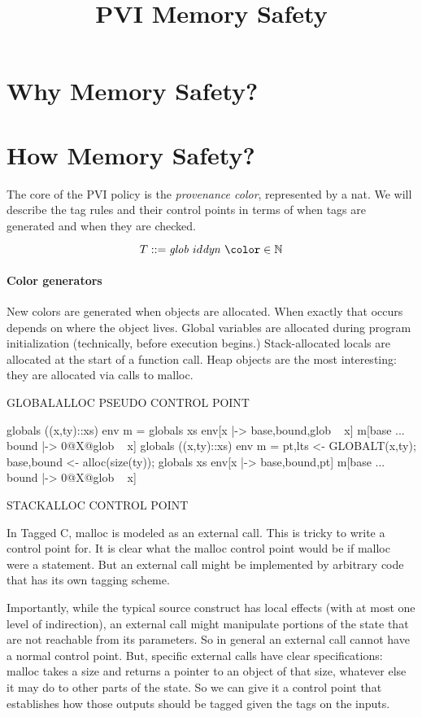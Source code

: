 \documentclass{article}
\title{PVI Memory Safety}
\begin{document}
\section{Why Memory Safety?}

\section{How Memory Safety?}

The core of the PVI policy is the {\it provenance color}, represented
by a nat. We will describe the tag rules and their control points in
terms of when tags are generated and when they are checked.

\[T ::= \mathit{glob} ~ id  \mathit{dyn} ~ \color \in \mathbb{N}\]

\paragraph*{Color generators}

New colors are generated when objects are allocated. When exactly that occurs
depends on where the object lives. Global variables are allocated during program
initialization (technically, before execution begins.) Stack-allocated locals
are allocated at the start of a function call. Heap objects are the most interesting:
they are allocated via calls to malloc.

GLOBALALLOC PSEUDO CONTROL POINT

globals ((x,ty)::xs) env m = globals xs env[x |-> base,bound,glob ~ x] m[base ... bound |-> 0@X@glob ~ x]
globals ((x,ty)::xs) env m =
pt,lts <- GLOBALT(x,ty);
base,bound <- alloc(size(ty));
globals xs env[x |-> base,bound,pt] m[base ... bound |-> 0@X@glob ~ x]

STACKALLOC CONTROL POINT

In Tagged C, malloc is modeled as an external call. This is tricky to write a control
point for. It is clear what the malloc control point would be if malloc were a 
statement. But an external call might be implemented by arbitrary code that has
its own tagging scheme.

Importantly, while the typical source construct has local effects (with at most
one level of indirection), an external call might manipulate portions of
the state that are not reachable from its parameters. So in general an external
call cannot have a normal control point. But, specific external calls have clear
specifications: malloc takes a size and returns a pointer to an object of that size,
whatever else it may do to other parts of the state. So we can give it a control point
that establishes how those outputs should be tagged given the tags on the inputs.
\end{document}
